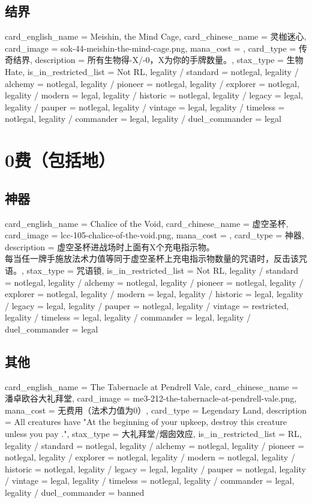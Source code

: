 \documentclass[lang = cn, color = black, 10pt]{AllThatStax}
\begin{document}
\section{结界}

\card
{
	card_english_name = {Meishin, the Mind Cage},
	card_chinese_name = {灵枷迷心},
	card_image = sok-44-meishin-the-mind-cage.png,
	mana_cost = ,
	card_type = 传奇结界,
	description = {所有生物得-X/-0，X为你的手牌数量。},
	stax_type = 生物Hate,
	is_in_restricted_list = Not RL,
	legality / standard = notlegal,
	legality / alchemy = notlegal,
	legality / pioneer = notlegal,
	legality / explorer = notlegal,
	legality / modern = legal,
	legality / historic = notlegal,
	legality / legacy = legal,
	legality / pauper = notlegal,
	legality / vintage = legal,
	legality / timeless = notlegal,
	legality / commander = legal,
	legality / duel_commander = legal
}

\chapter{0费（包括地）}

\section{神器}

\card
{
	card_english_name = {Chalice of the Void},
	card_chinese_name = {虚空圣杯},
	card_image = lcc-105-chalice-of-the-void.png,
	mana_cost = ,
	card_type = 神器,
	description = {虚空圣杯进战场时上面有X个充电指示物。\\
		每当任一牌手施放法术力值等同于虚空圣杯上充电指示物数量的咒语时，反击该咒语。},
	stax_type = 咒语锁,
	is_in_restricted_list = Not RL,
	legality / standard = notlegal,
	legality / alchemy = notlegal,
	legality / pioneer = notlegal,
	legality / explorer = notlegal,
	legality / modern = legal,
	legality / historic = legal,
	legality / legacy = legal,
	legality / pauper = notlegal,
	legality / vintage = restricted,
	legality / timeless = legal,
	legality / commander = legal,
	legality / duel_commander = legal
}

\section{其他}

\card
{
	card_english_name = {The Tabernacle at Pendrell Vale},
	card_chinese_name = {潘卓欧谷大礼拜堂},
	card_image = me3-212-the-tabernacle-at-pendrell-vale.png,
	mana_cost = 无费用（法术力值为0）,
	card_type = Legendary Land,
	description = {All creatures have "At the beginning of your upkeep, destroy this creature unless you pay ."},
	stax_type = 大礼拜堂/烟囱效应,
	is_in_restricted_list = RL,
	legality / standard = notlegal,
	legality / alchemy = notlegal,
	legality / pioneer = notlegal,
	legality / explorer = notlegal,
	legality / modern = notlegal,
	legality / historic = notlegal,
	legality / legacy = legal,
	legality / pauper = notlegal,
	legality / vintage = legal,
	legality / timeless = notlegal,
	legality / commander = legal,
	legality / duel_commander = banned
}

\end{document}
